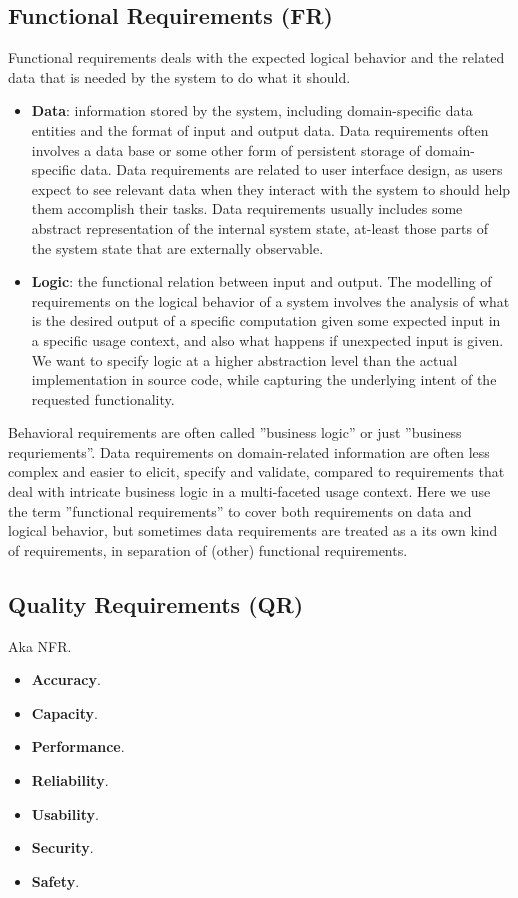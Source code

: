 \subsection{Functional Requirements (FR)}
Functional requirements deals with the expected logical behavior and the related data that is needed by the system to do what it should.
\begin{itemize}
  \item \textbf{Data}: information stored by the system, including domain-specific data entities and the format of input and output data. Data requirements often involves a data base or some other form of persistent storage of domain-specific data. Data requirements are related to user interface design, as users expect to see relevant data when they interact with the system to should help them accomplish their tasks. Data requirements usually includes some abstract representation of the internal system state, at-least those parts of the system state that are externally observable.
  \item \textbf{Logic}: the functional relation between input and output. The modelling of requirements on the logical behavior of a system involves the analysis of what is the desired output of a specific computation given some expected input in a specific usage context, and also what happens if unexpected input is given. We want to specify logic at a higher abstraction level than the actual implementation in source code, while capturing the underlying intent of the requested functionality. 
\end{itemize}

Behavioral requirements are often called ''business logic'' or just ''business requriements''. Data requirements on domain-related information are often less complex and easier to elicit, specify and validate, compared to requirements that deal with intricate business logic in a multi-faceted usage context. Here we use the term ''functional requirements'' to cover both requirements on data and logical behavior, but sometimes data requirements are treated as a its own kind of requirements, in separation of (other) functional requirements. 

\subsection{Quality Requirements (QR)}

Aka NFR.

\begin{itemize}
  \item \textbf{Accuracy}. 
  \item \textbf{Capacity}.
  \item \textbf{Performance}.
  \item \textbf{Reliability}.
  \item \textbf{Usability}.
  \item \textbf{Security}.
  \item \textbf{Safety}.
\end{itemize}

